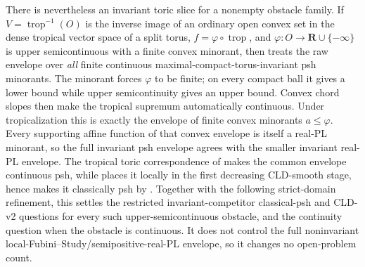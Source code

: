 There is nevertheless an invariant toric slice for a nonempty
obstacle family.  If \(V=\operatorname{trop}^{-1}(O)\) is the inverse image
of an ordinary open convex set in the dense tropical vector space of a split
torus, \(f=\varphi\circ\operatorname{trop}\), and
\(\varphi:O\to\mathbf R\cup\{-\infty\}\) is upper semicontinuous with a
finite convex minorant, then
 treats the raw envelope
over \emph{all} finite continuous maximal-compact-torus-invariant psh
minorants.  The minorant forces \(\varphi\) to be finite; on every compact
ball it gives a lower bound while upper semicontinuity gives an upper bound.
Convex chord slopes then make the tropical supremum automatically continuous.
Under tropicalization this is exactly the envelope of finite convex minorants
\(a\leq\varphi\).  Every supporting affine function of that convex envelope
is itself a real-PL minorant, so the full invariant psh envelope agrees with
the smaller invariant real-PL envelope.  The tropical toric correspondence of
\cite[Theorem~5.3.11]{BGJKK25} makes the common envelope continuous psh, while
 places it locally
in the first decreasing CLD-smooth stage, hence makes it classically psh by
.  Together with the following strict-domain
refinement, this settles the restricted invariant-competitor
classical-psh and CLD-v2 questions for every such upper-semicontinuous
obstacle, and the continuity question when the obstacle is continuous.  It
does not control the full noninvariant local-Fubini--Study/semipositive-real-PL
envelope, so it changes no open-problem count.



